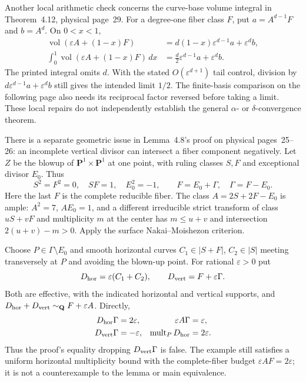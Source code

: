 Another local arithmetic check concerns the curve-base volume
integral in Theorem~4.12, physical page~29. For a degree-one
fiber class $F$, put $a=A^{d-1}F$ and $b=A^d$. On $0<x<1$,
\[
 \begin{aligned}
 \operatorname{vol}(\varepsilon A+(1-x)F)
   &=d(1-x)\varepsilon^{d-1}a+\varepsilon^d b,\\
 \int_0^1\operatorname{vol}(\varepsilon A+(1-x)F)\,dx
   &=\frac d2\varepsilon^{d-1}a+\varepsilon^d b.
 \end{aligned}
\]
The printed integral omits $d$. With the stated
$O(\varepsilon^{d+1})$ tail control, division by
$d\varepsilon^{d-1}a+\varepsilon^d b$ still gives the intended
limit $1/2$. The finite-basis comparison on the following page
also needs its reciprocal factor reversed before taking a limit.
These local repairs do not independently establish the general
$\alpha$- or $\delta$-convergence theorem.

There is a separate geometric issue in Lemma~4.8's proof on
physical pages~25--26: an incomplete vertical divisor can
intersect a fiber component negatively. Let $Z$ be the blowup
of $\mathbf P^1\times\mathbf P^1$ at one point, with ruling
classes $S,F$ and exceptional divisor $E_0$. Thus
\[
 S^2=F^2=0,\quad SF=1,\quad E_0^2=-1,
 \qquad F=E_0+\Gamma,\quad\Gamma=F-E_0.
\]
Here the last $F$ is the complete reducible fiber. The class
$A=2S+2F-E_0$ is ample: $A^2=7$, $AE_0=1$, and a different
irreducible strict transform of class $uS+vF$ and multiplicity
$m$ at the center has $m\leq u+v$ and intersection
$2(u+v)-m>0$. Apply the surface Nakai--Moishezon criterion.

Choose $P\in\Gamma\setminus E_0$ and smooth horizontal curves
$C_1\in|S+F|$, $C_2\in|S|$ meeting transversely at $P$ and
avoiding the blown-up point. For rational $\varepsilon>0$ put
\[
 D_{\rm hor}=\varepsilon(C_1+C_2),\qquad
 D_{\rm vert}=F+\varepsilon\Gamma.
\]
Both are effective, with the indicated horizontal and vertical
supports, and $D_{\rm hor}+D_{\rm vert}\sim_{\mathbf Q}
F+\varepsilon A$. Directly,
\[
 \begin{aligned}
 D_{\rm hor}\Gamma&=2\varepsilon,&
 \varepsilon A\Gamma&=\varepsilon,\\
 D_{\rm vert}\Gamma&=-\varepsilon,&
 \operatorname{mult}_P D_{\rm hor}&=2\varepsilon.
 \end{aligned}
\]
Thus the proof's equality dropping $D_{\rm vert}\Gamma$
is false. The example still satisfies a uniform horizontal
multiplicity bound with the complete-fiber budget
$\varepsilon AF=2\varepsilon$; it is not a counterexample to
the lemma or main equivalence.

